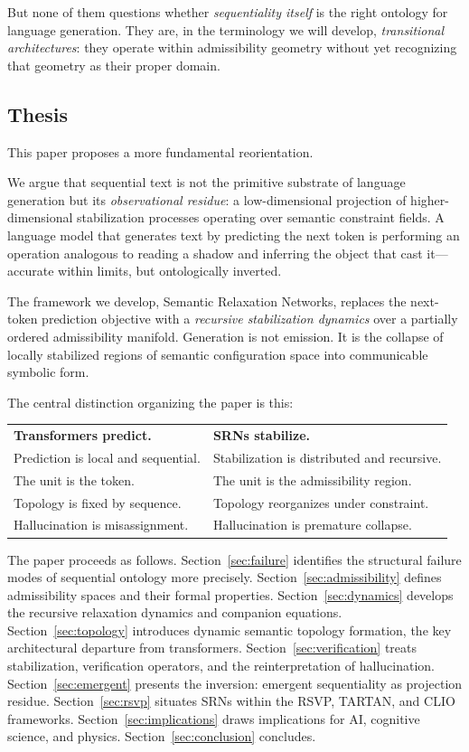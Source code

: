 \documentclass[11pt, a4paper]{article}
\theoremstyle{srn}
\theoremstyle{srnremark}
\begin{document}
But none of them questions whether \emph{sequentiality itself} is the
right ontology for language generation.
They are, in the terminology we will develop, \emph{transitional
architectures}: they operate within admissibility geometry without
yet recognizing that geometry as their proper domain.

\subsection{Thesis}

This paper proposes a more fundamental reorientation.

We argue that sequential text is not the primitive substrate of
language generation but its \emph{observational residue}: a
low-dimensional projection of higher-dimensional stabilization
processes operating over semantic constraint fields.
A language model that generates text by predicting the next token is
performing an operation analogous to reading a shadow and inferring the
object that cast it---accurate within limits, but ontologically
inverted.

The framework we develop, Semantic Relaxation Networks, replaces the
next-token prediction objective with a \emph{recursive stabilization
dynamics} over a partially ordered admissibility manifold.
Generation is not emission.
It is the collapse of locally stabilized regions of semantic
configuration space into communicable symbolic form.

The central distinction organizing the paper is this:

\begin{center}
\begin{tabular}{ll}
\textbf{Transformers predict.} & \textbf{SRNs stabilize.}\\
Prediction is local and sequential. & Stabilization is distributed and recursive.\\
The unit is the token. & The unit is the admissibility region.\\
Topology is fixed by sequence. & Topology reorganizes under constraint.\\
Hallucination is misassignment. & Hallucination is premature collapse.
\end{tabular}
\end{center}

\noindent The paper proceeds as follows.
Section~\ref{sec:failure} identifies the structural failure modes
of sequential ontology more precisely.
Section~\ref{sec:admissibility} defines admissibility spaces and
their formal properties.
Section~\ref{sec:dynamics} develops the recursive relaxation dynamics
and companion equations.
Section~\ref{sec:topology} introduces dynamic semantic topology
formation, the key architectural departure from transformers.
Section~\ref{sec:verification} treats stabilization, verification
operators, and the reinterpretation of hallucination.
Section~\ref{sec:emergent} presents the inversion: emergent
sequentiality as projection residue.
Section~\ref{sec:rsvp} situates SRNs within the RSVP, TARTAN, and
CLIO frameworks.
Section~\ref{sec:implications} draws implications for AI, cognitive
science, and physics.
Section~\ref{sec:conclusion} concludes.
\end{document}
